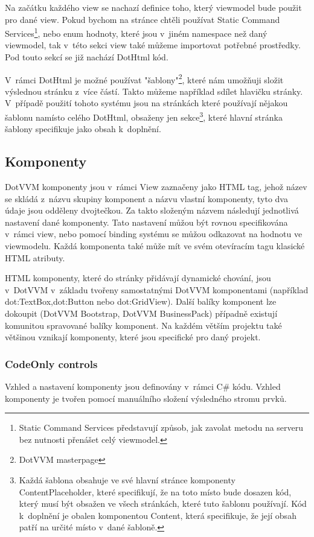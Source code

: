     Na začátku každého view se nachazí definice toho, který viewmodel bude použit pro dané view. Pokud bychom na stránce chtěli používat Static Command Services\footnote{Static Command Services představují způsob, jak zavolat metodu na serveru bez nutnosti přenášet celý viewmodel.}, nebo enum hodnoty, které jsou v~jiném namespace než daný viewmodel, tak v~této sekci view také můžeme importovat potřebné prostředky. Pod touto sekcí se již nachází DotHtml kód.
    
    V~rámci DotHtml je možné používat "šablony"\footnote{DotVVM masterpage}, které nám umožňuji složit výslednou stránku z~více částí. Takto můžeme například sdílet hlavičku stránky. V~případě použití tohoto systému jsou na stránkách které používají nějakou šablonu namísto celého DotHtml, obsaženy jen sekce\footnote{Každá šablona obsahuje ve své hlavní stránce komponenty ContentPlaceholder, které specifikují, že na toto místo bude dosazen kód, který musí být obsažen ve všech stránkách, které tuto šablonu používají. Kód k~doplnění je obalen komponentou Content, která specifikuje, že její obsah patří na určité místo v~dané šabloně.}, které hlavní stránka šablony specifikuje jako obsah k~doplnění.

\subsection*{Komponenty}
DotVVM komponenty jsou v~rámci View zaznačeny jako HTML tag, jehož název se skládá z~názvu skupiny komponent a názvu vlastní komponenty, tyto dva údaje jsou odděleny dvojtečkou. Za takto složeným názvem následují jednotlivá nastavení dané komponenty. Tato nastavení můžou být rovnou specifikována v~rámci view, nebo pomocí binding systému se můžou odkazovat na hodnotu ve viewmodelu. Každá komponenta také může mít ve svém otevíracím tagu klasické HTML atributy. 

HTML komponenty, které do stránky přidávají dynamické chování, jsou v~DotVVM v~základu tvořeny samostatnými DotVVM komponentami (například dot:TextBox,dot:Button nebo dot:GridView). Další balíky komponent lze dokoupit (DotVVM Bootstrap, DotVVM BusinessPack) případně existují komunitou spravované balíky komponent. Na každém větším projektu také většinou vznikají komponenty, které jsou specifické pro daný projekt.

\subsubsection{CodeOnly controls}
Vzhled a nastavení komponenty jsou definovány v~rámci C\# kódu. Vzhled komponenty je tvořen pomocí manuálního složení výsledného stromu prvků.

